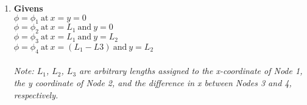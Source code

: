 \documentclass[12pt,letterpaper]{article}
\begin{document}
		\begin{enumerate}[label=\arabic*.]
			\item{\textbf{Givens}}\\
			$\phi = \phi_1 \ \mathrm{at} \ x = y = 0$\\ 
			$\phi = \phi_2 \ \mathrm{at} \ x = L_1 \ \mathrm{and} \ y = 0$\\
			$\phi = \phi_3 \ \mathrm{at} \ x = L_1 \ \mathrm{and} \ y = L_2$\\
			$\phi = \phi_4 \ \mathrm{at} \ x = (L_1-L3) \ \mathrm{and} \ y = L_2$\\ \\
			\textit{Note: $L_1$, $L_2$, $L_3$ are arbitrary lengths assigned to the x-coordinate of Node 1, the y coordinate of Node 2, and the difference in x between Nodes 3 and 4, respectively.}
			\\


\end{enumerate}
\end{document}
